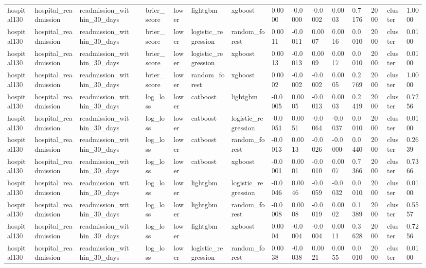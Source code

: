 \begin{tabular}{llllllllllllllll}
hospital130 & hospital\_readmission & readmission\_within\_30\_days &  & brier\_score & lower & lightgbm & xgboost & 0.0000 & -0.0000 & -0.0002 & 0.0003 & 0.7176 & 2000 & cluster & 1.0000 \\
hospital130 & hospital\_readmission & readmission\_within\_30\_days &  & brier\_score & lower & logistic\_regression & random\_forest & 0.0011 & -0.0011 & 0.0007 & 0.0016 & 0.0010 & 2000 & cluster & 0.0100 \\
hospital130 & hospital\_readmission & readmission\_within\_30\_days &  & brier\_score & lower & logistic\_regression & xgboost & 0.0013 & -0.0013 & 0.0009 & 0.0017 & 0.0010 & 2000 & cluster & 0.0100 \\
hospital130 & hospital\_readmission & readmission\_within\_30\_days &  & brier\_score & lower & random\_forest & xgboost & 0.0002 & -0.0002 & -0.0002 & 0.0005 & 0.2769 & 2000 & cluster & 1.0000 \\
hospital130 & hospital\_readmission & readmission\_within\_30\_days &  & log\_loss & lower & catboost & lightgbm & -0.0005 & 0.0005 & -0.0013 & 0.0003 & 0.2419 & 2000 & cluster & 0.7256 \\
hospital130 & hospital\_readmission & readmission\_within\_30\_days &  & log\_loss & lower & catboost & logistic\_regression & -0.0051 & 0.0051 & -0.0064 & -0.0037 & 0.0010 & 2000 & cluster & 0.0100 \\
hospital130 & hospital\_readmission & readmission\_within\_30\_days &  & log\_loss & lower & catboost & random\_forest & -0.0013 & 0.0013 & -0.0026 & -0.0000 & 0.0440 & 2000 & cluster & 0.2639 \\
hospital130 & hospital\_readmission & readmission\_within\_30\_days &  & log\_loss & lower & catboost & xgboost & -0.0001 & 0.0001 & -0.0010 & 0.0007 & 0.7366 & 2000 & cluster & 0.7366 \\
hospital130 & hospital\_readmission & readmission\_within\_30\_days &  & log\_loss & lower & lightgbm & logistic\_regression & -0.0046 & 0.0046 & -0.0059 & -0.0032 & 0.0010 & 2000 & cluster & 0.0100 \\
hospital130 & hospital\_readmission & readmission\_within\_30\_days &  & log\_loss & lower & lightgbm & random\_forest & -0.0008 & 0.0008 & -0.0019 & 0.0002 & 0.1389 & 2000 & cluster & 0.5557 \\
hospital130 & hospital\_readmission & readmission\_within\_30\_days &  & log\_loss & lower & lightgbm & xgboost & 0.0004 & -0.0004 & -0.0004 & 0.0011 & 0.3628 & 2000 & cluster & 0.7256 \\
hospital130 & hospital\_readmission & readmission\_within\_30\_days &  & log\_loss & lower & logistic\_regression & random\_forest & 0.0038 & -0.0038 & 0.0021 & 0.0055 & 0.0010 & 2000 & cluster & 0.0100 \\

\end{tabular}
